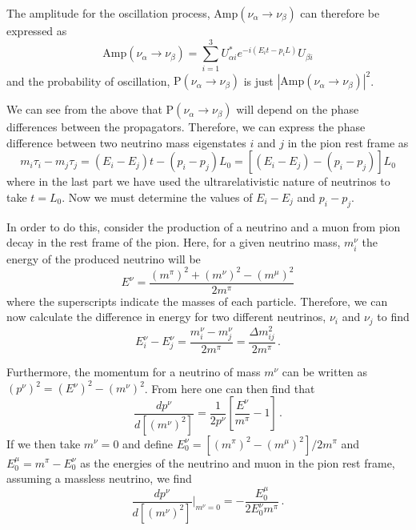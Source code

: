 The amplitude for the oscillation process, $\text{Amp}(\nu_{\alpha} \rightarrow \nu_{\beta})$ can therefore be expressed as
\begin{equation}
  \text{Amp}(\nu_{\alpha} \rightarrow \nu_{\beta}) = \sum_{i=1}^{3} U^{*}_{\alpha i} e^{-i (E_{i}t - p_{i}L) } U_{\beta i}
  \label{eq:oscAmp}
\end{equation}
and the probability of oscillation, $\text{P}(\nu_{\alpha} \rightarrow \nu_{\beta})$ is just $|\text{Amp}(\nu_{\alpha} \rightarrow \nu_{\beta})|^{2}$.

We can see from the above that $\text{P}(\nu_{\alpha} \rightarrow \nu_{\beta})$ will depend on the phase differences between the propagators.
Therefore, we can express the phase difference between two neutrino mass eigenstates $i$ and $j$ in the pion rest frame as
\begin{equation}
  m_{i}\tau_{i} - m_{j}\tau_{j} = \left( E_{i} - E_{j} \right)t - \left( p_{i} - p_{j} \right) L_{0}  =  \left[ \left( E_{i} - E_{j} \right) - \left( p_{i} - p_{j} \right) \right]L_{0}
  \label{eq:phaseDiff}
\end{equation}
where in the last part we have used the ultrarelativistic nature of neutrinos to take $t=L_{0}$.
Now we must determine the values of $E_{i} - E_{j}$ and $p_{i} - p_{j}$.

In order to do this, consider the production of a neutrino and a muon from pion decay in the rest frame of the pion.
Here, for a given neutrino mass, $m_{i}^{\nu}$ the energy of the produced neutrino will be
\begin{equation}
  E^{\nu} = \frac{ (m^{\pi})^{2} + (m^{\nu})^{2} - (m^{\mu})^{2} }{ 2m^{\pi} }
\end{equation}
where the superscripts indicate the masses of each particle.
Therefore, we can now calculate the difference in energy for two different neutrinos, $\nu_{i}$ and $\nu_{j}$ to find
\begin{equation}
  E^{\nu}_{i} - E^{\nu}_{j} = \frac{ m_{i}^{\nu} - m_{j}^{\nu} }{ 2m^{\pi} } = \frac{\Delta m_{ij}^{2}}{2m^{\pi}} \, .
  \label{eq:nuDeltaE}
\end{equation}

Furthermore, the momentum for a neutrino of mass $m^{\nu}$ can be written as $(p^{\nu})^{2} = (E^{\nu})^{2} - (m^{\nu})^{2}$.
From here one can then find that
\begin{equation}
  \frac{ dp^{\nu} }{ d[(m^{\nu})^{2}] } = \frac{ 1 }{ 2p^{\nu} } \left[ \frac{ E^{\nu}}{ m^{\pi} } - 1 \right] \, .
\end{equation}
If we then take $m^{\nu} = 0$ and define $E_{0}^{\nu} = [(m^{\pi})^{2} - (m^{\mu})^{2}]/2m^{\pi}$ and $E_{0}^{\mu} = m^{\pi} - E_{0}^{\nu}$ as the energies of the neutrino and muon in the pion rest frame, assuming a massless neutrino, we find
\begin{equation}
  \frac{ dp^{\nu} }{ d[(m^{\nu})^{2}] }\bigg|_{m^{\nu}=0} = -\frac{ E^{\mu}_{0} }{ 2E^{\nu}_{0}m^{\pi} } \, .
\end{equation}

